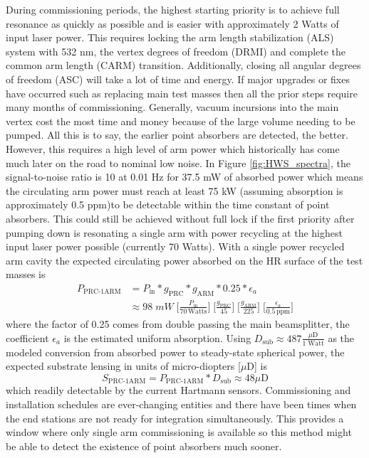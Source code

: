 	During commissioning periods, the highest starting priority is to achieve full resonance as quickly as possible and is easier with approximately 2 Watts of input laser power. This requires locking the arm length stabilization (ALS) system with 532 nm, the vertex degrees of freedom (DRMI) and complete the common arm length (CARM) transition. Additionally, closing all angular degrees of freedom (ASC) will take a lot of time and energy.  If major upgrades or fixes have occurred such as replacing main test masses then all the prior steps require many months of commissioning.  Generally, vacuum incursions into the main vertex cost the most time and money because of the large volume needing to be pumped.  All this is to say, the earlier point absorbers are detected, the better.  However, this requires a high level of arm power which historically has come much later on the road to nominal low noise.  In Figure \ref{fig:HWS_spectra}, the signal-to-noise ratio is 10 at 0.01 Hz for 37.5 mW of absorbed power which means the circulating arm power must reach at least 75 kW  (assuming absorption is approximately 0.5 ppm)to be detectable within the time constant of point absorbers. This could still be achieved without full lock if the first priority after pumping down is resonating a single arm with power recycling at the highest input laser power possible (currently 70 Watts).  With a single power recycled arm cavity the expected circulating power absorbed on the HR surface of the test masses is
	\begin{equation}
	\begin{aligned}
	P_\text{PRC-1ARM} &= P_{\text{in}} * g_{\text{PRC}} * g_{\text{ARM}} * 0.25 * \epsilon_a\\
	&\approx 98 \; mW \; \bigg[\frac{P_{\text{in}}}{70 \, \text{Watts}}\bigg] \; \bigg[\frac{g_{\text{PRC}}}{ 45 }\bigg] \; \bigg[\frac{g_{\text{ARM}}}{ 225 }\bigg] \; \bigg[\frac{\epsilon_a}{0.5 \, \text{ppm}}\bigg]
	\end{aligned}
	\end{equation}
	where the factor of 0.25 comes from double passing the main beamsplitter, the coefficient $\epsilon_a$ is the estimated uniform absorption.  Using $ D_{\text{sub}} \approx 487 \frac{\mu \text{D}}{1 \; \text{Watt}}$ as the modeled conversion from absorbed power to steady-state spherical power, the expected substrate lensing in units of micro-diopters [$\mu \text{D}$] is
	\begin{equation}
	S_\text{PRC-1ARM} = P_\text{PRC-1ARM} *  D_{\text{sub}} \approx 48 \mu\text{D}
	\end{equation}
	 which readily detectable by the current Hartmann sensors. Commissioning and installation schedules are ever-changing entities and there have been times when the end stations are not ready for integration simultaneously. This provides a window where only single arm commissioning is available so this method might be able to detect the existence of point absorbers much sooner.
	 
